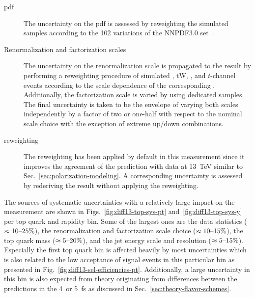 \begin{description}
\item[\Acrlong{pdf}] The uncertainty on the \gls{pdf} is assessed by reweighting the simulated samples according to the 102 variations of the NNPDF3.0 set~\cite{Ball:2014uwa}.

\item[Renormalization and factorization scales] The uncertainty on the renormalization scale is propagated to the result by performing a reweighting procedure of simulated \ttbar, tW, \wjets, and $t$-channel events according to the scale dependence of the corresponding . Additionally, the factorization scale is varied by using dedicated samples. The final uncertainty is taken to be the envelope of varying both scales independently by a factor of two or one-half with respect to the nominal scale choice with the exception of extreme up/down combinations.

\item[\ttbar \pt reweighting] The \ttbar \pt reweighting has been applied by default in this measurement since it improves the agreement of the prediction with data at 13~TeV similar to Sec.~\ref{sec:polarization-modeling}. A corresponding uncertainty is assessed by rederiving the result without applying the reweighting.
\end{description}

The sources of systematic uncertainties with a relatively large impact on the measurement are shown in Figs.~\ref{fig:diff13-top-sys-pt} and~\ref{fig:diff13-top-sys-y} per top quark \pt and rapidity bin. Some of the largest ones are the data statistics ($\approx10\text{--}25\%$), the renormalization and factorization scale choice ($\approx10\text{--}15\%$), the top quark mass ($\approx5\text{--}20\%$), and the jet energy scale and resolution ($\approx5\text{--}15\%$). Especially the first top quark \pt bin is affected heavily by most uncertainties which is also related to the low acceptance of signal events in this particular bin as presented in Fig.~\ref{fig:diff13-sel-efficiencies-pt}. Additionally, a large uncertainty in this bin is also expected from theory originating from differences between the predictions in the 4~or 5~\gls{fs} as discussed in Sec.~\ref{sec:theory-flavor-schemes}.

